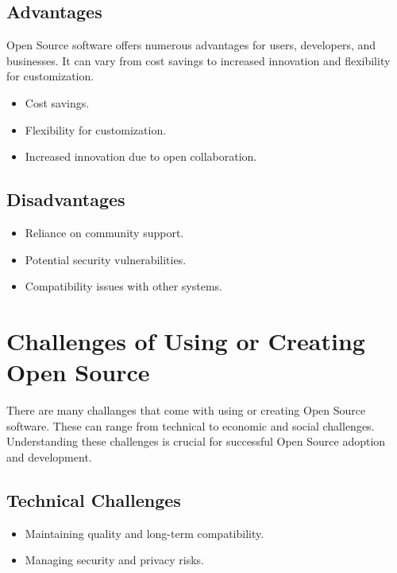 \subsection{Advantages}

Open Source software offers numerous advantages for users, developers, and businesses. It can vary from cost savings to increased innovation and flexibility for customization.


\begin{itemize}
    \item Cost savings.
    \item Flexibility for customization.
    \item Increased innovation due to open collaboration.
\end{itemize}

\subsection{Disadvantages}


\begin{itemize}
    \item Reliance on community support.
    \item Potential security vulnerabilities.
    \item Compatibility issues with other systems.
\end{itemize}

\section{Challenges of Using or Creating Open Source}

There are many challanges that come with using or creating Open Source software. These can range from technical to economic and social challenges. 
Understanding these challenges is crucial for successful Open Source adoption and development.

\subsection{Technical Challenges}


\begin{itemize}
    \item Maintaining quality and long-term compatibility.
    \item Managing security and privacy risks.
\end{itemize}

